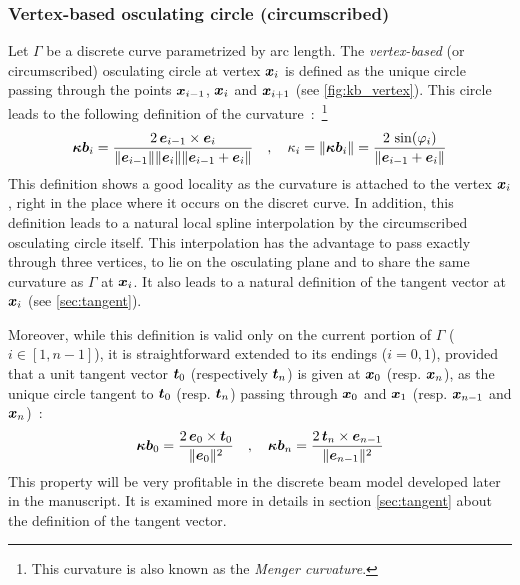 \subsubsection{Vertex-based osculating circle (circumscribed)}\label{sec:circumscribed}
Let $\Gamma$ be a discrete curve parametrized by arc length. The \emph{vertex-based} (or circumscribed) osculating circle at vertex $\boldsymbol{x}_{i}$ is defined as the unique circle passing through the points $\boldsymbol{x}_{i-1}$, $\boldsymbol{x}_{i}$ and $\boldsymbol{x}_{i+1}$ (see \cref{fig:kb_vertex}). This circle leads to the following definition of the curvature~:~\footnote{This curvature is also known as the \emph{Menger curvature}.}
\begin{equation}
	\boldsymbol{\kappa b}_i = \frac{2 \, \boldsymbol{e}_{i-1} \times \boldsymbol{e}_{i}}{\lVert\boldsymbol{e}_{i-1}\rVert \lVert\boldsymbol{e}_{i}\rVert \lVert\boldsymbol{e}_{i-1} + \boldsymbol{e}_{i}\rVert }
	\quad , \quad
	\kappa_i = \lVert\boldsymbol{\kappa b}_i\rVert = \frac{2 \, \sin(\varphi_i)}{\lVert\boldsymbol{e}_{i-1} + \boldsymbol{e}_{i}\rVert}
\label{eq:def_kb_vertex}
\end{equation}
This definition shows a good locality as the curvature is attached to the vertex $\boldsymbol{x}_{i}$, right in the place where it occurs on the discret curve. In addition, this definition leads to a natural local spline interpolation by the circumscribed osculating circle itself. This interpolation has the advantage to pass exactly through three vertices, to lie on the osculating plane and to share the same curvature as $\Gamma$ at $\boldsymbol{x}_{i}$. It also leads to a natural definition of the tangent vector at $\boldsymbol{x}_{i}$ (see \cref{sec:tangent}).

Moreover, while this definition is valid only on the current portion of $\Gamma$ ($i \in[1, n-1]$), it is straightforward extended to its endings ($i=0,1$), provided that a unit tangent vector $\boldsymbol{t}_{0}$ (respectively $\boldsymbol{t}_{n}$) is given at $\boldsymbol{x}_{0}$ (resp. $\boldsymbol{x}_{n}$), as the unique circle tangent to $\boldsymbol{t}_{0}$ (resp. $\boldsymbol{t}_{n}$) passing through $\boldsymbol{x}_0$ and $\boldsymbol{x}_1$ (resp. $\boldsymbol{x}_{n-1}$ and $\boldsymbol{x}_n$)~:
\begin{equation}
	\boldsymbol{\kappa b}_0 = \frac{2 \, \boldsymbol{e}_{0} \times \boldsymbol{t}_{0}}{\lVert\boldsymbol{e}_{0}\rVert^2} 
	\quad , \quad
	\boldsymbol{\kappa b}_n = \frac{2 \, \boldsymbol{t}_{n} \times \boldsymbol{e}_{n-1}}{\lVert\boldsymbol{e}_{n-1}\rVert^2} 
\end{equation}
This property will be very profitable in the discrete beam model developed later in the manuscript. It is examined more in details in section \cref{sec:tangent} about the definition of the tangent vector.


